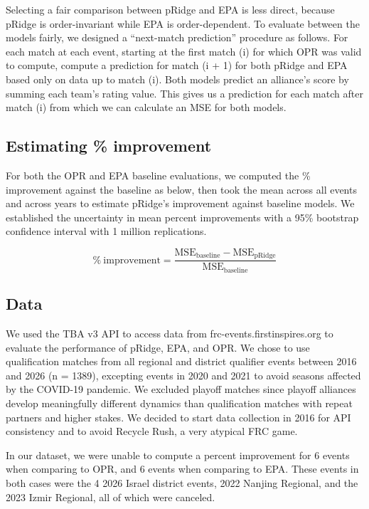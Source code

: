 \documentclass[
  12pt]{article}
\begin{document}
Selecting a fair comparison between pRidge and EPA is less direct,
because pRidge is order-invariant while EPA is order-dependent. To
evaluate between the models fairly, we designed a ``next-match
prediction'' procedure as follows. For each match at each event,
starting at the first match (i) for which OPR was valid to compute,
compute a prediction for match (i + 1) for both pRidge and EPA based
only on data up to match (i). Both models predict an alliance's score by
summing each team's rating value. This gives us a prediction for each
match after match (i) from which we can calculate an MSE for both
models.

\subsection{Estimating \% improvement}\label{estimating-improvement}

For both the OPR and EPA baseline evaluations, we computed the \%
improvement against the baseline as below, then took the mean across all
events and across years to estimate pRidge's improvement against
baseline models. We established the uncertainty in mean percent
improvements with a 95\% bootstrap \citep{uva_bootstrap} confidence
interval with 1 million replications.

\[
\%\ \text{improvement} = \frac{\text{MSE}_{\text{baseline}} - \text{MSE}_{\text{pRidge}}}{\text{MSE}_{\text{baseline}}}
\]

\subsection{Data}\label{data}

We used the TBA v3 API to access data from frc-events.firstinspires.org
to evaluate the performance of pRidge, EPA, and OPR. We chose to use
qualification matches from all regional and district qualifier events
between 2016 and 2026 (n = 1389), excepting events in 2020 and 2021 to
avoid seasons affected by the COVID-19 pandemic. We excluded playoff
matches since playoff alliances develop meaningfully different dynamics
than qualification matches with repeat partners and higher stakes. We
decided to start data collection in 2016 for API consistency and to
avoid Recycle Rush, a very atypical FRC game.

In our dataset, we were unable to compute a percent improvement for 6
events when comparing to OPR, and 6 events when comparing to EPA. These
events in both cases were the 4 2026 Israel district events, 2022
Nanjing Regional, and the 2023 Izmir Regional, all of which were
canceled.
\end{document}
